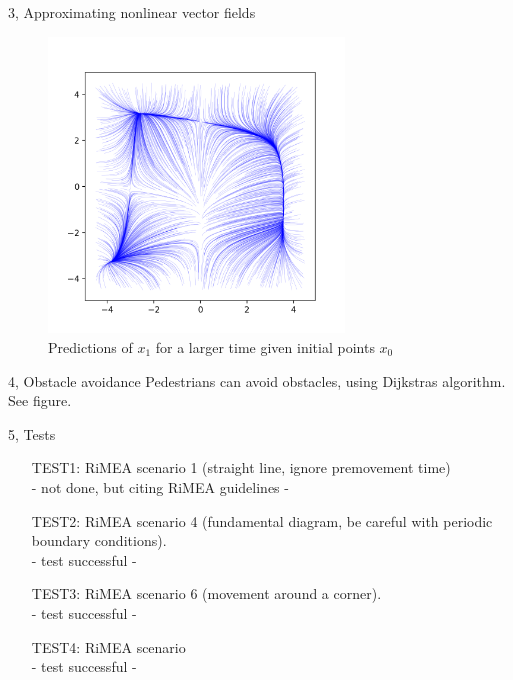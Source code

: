 \documentclass[10pt,a4paper]{article}
\begin{document}
\begin{task}{3, Approximating nonlinear vector fields}
\begin{figure}[H]
\includegraphics[width=0.7\textwidth]{../plots/task3_part3.png}
\caption{Predictions of $x_1$ for a larger time given initial points $x_0$}
\label{fig:task3_part3}
\end{figure}

\end{task}
\begin{task}{4, Obstacle avoidance}
Pedestrians can avoid obstacles, using Dijkstras algorithm. See figure.
\end{task}
\begin{task}{5, Tests}
\begin{enumerate}
\item[TEST1:] RiMEA scenario 1 (straight line, ignore premovement time)\\
- not done, but citing RiMEA guidelines -
\item[TEST2:] RiMEA scenario 4 (fundamental diagram, be careful with periodic boundary conditions).\\
- test successful - 
\item[TEST3:] RiMEA scenario 6 (movement around a corner).\\
- test successful - 
\item[TEST4:] RiMEA scenario\\
- test successful - 
\end{enumerate}
\end{task}
\end{document}
